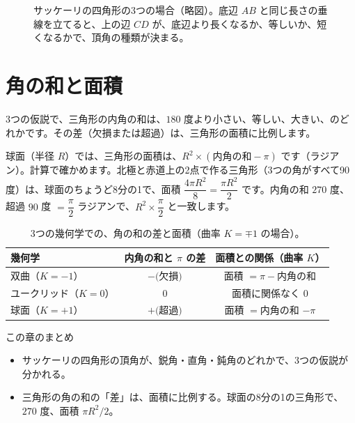 \documentclass[a4paper,11pt,openany]{ltjsbook}
\begin{document}
\begin{figure}[htbp]
\centering
{}
\caption{サッケーリの四角形の3つの場合（略図）。底辺 $AB$ と同じ長さの垂線を立てると、上の辺 $CD$ が、底辺より長くなるか、等しいか、短くなるかで、頂角の種類が決まる。}
\end{figure}

\section{角の和と面積}

3つの仮説で、三角形の内角の和は、$180$ 度より小さい、等しい、大きい、のどれかです。その差（欠損または超過）は、三角形の面積に比例します。

球面（半径 $R$）では、三角形の面積は、$R^2\times(\text{内角の和}-\pi)$ です（ラジアン）。計算で確かめます。北極と赤道上の2点で作る三角形（3つの角がすべて90度）は、球面のちょうど8分の1で、面積 $\dfrac{4\pi R^2}{8}=\dfrac{\pi R^2}{2}$ です。内角の和 $270$ 度、超過 $90$ 度 $=\dfrac\pi2$ ラジアンで、$R^2\times\dfrac\pi2$ と一致します。

\begin{table}[htbp]
\centering
\begin{tabular}{lcc}
\toprule
幾何学 & 内角の和と $\pi$ の差 & 面積との関係（曲率 $K$）\\
\midrule
双曲（$K=-1$） & $-($欠損$)$ & 面積 $=\pi-$内角の和\\
ユークリッド（$K=0$） & $0$ & 面積に関係なく $0$\\
球面（$K=+1$） & $+($超過$)$ & 面積 $=$内角の和 $-\pi$\\
\bottomrule
\end{tabular}
\caption{3つの幾何学での、角の和の差と面積（曲率 $K=\mp1$ の場合）。}
\end{table}

\begin{pointbox}{この章のまとめ}
\begin{itemize}[leftmargin=*]
\item サッケーリの四角形の頂角が、鋭角・直角・鈍角のどれかで、3つの仮説が分かれる。
\item 三角形の角の和の「差」は、面積に比例する。球面の8分の1の三角形で、$270$ 度、面積 $\pi R^2/2$。
\end{itemize}
\end{pointbox}
\end{document}
